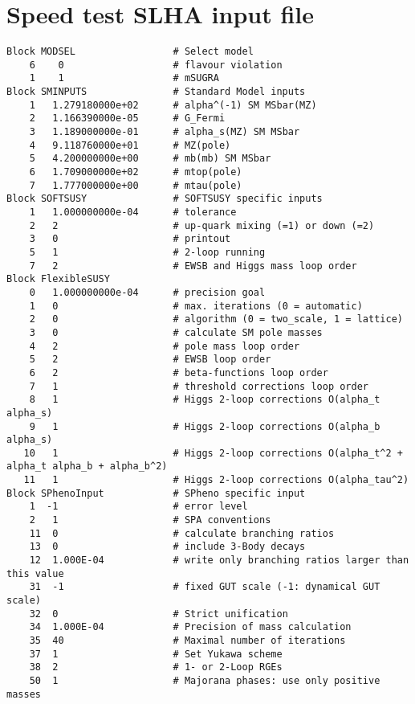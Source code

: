 \documentclass[final,3p,11pt,pdflatex]{elsarticle}
\begin{document}
\section{Speed test SLHA input file}
\label{sec:speed-test-slha-template-file}
%
\begin{lstlisting}
Block MODSEL                 # Select model
    6    0                   # flavour violation
    1    1                   # mSUGRA
Block SMINPUTS               # Standard Model inputs
    1   1.279180000e+02      # alpha^(-1) SM MSbar(MZ)
    2   1.166390000e-05      # G_Fermi
    3   1.189000000e-01      # alpha_s(MZ) SM MSbar
    4   9.118760000e+01      # MZ(pole)
    5   4.200000000e+00      # mb(mb) SM MSbar
    6   1.709000000e+02      # mtop(pole)
    7   1.777000000e+00      # mtau(pole)
Block SOFTSUSY               # SOFTSUSY specific inputs
    1   1.000000000e-04      # tolerance
    2   2                    # up-quark mixing (=1) or down (=2)
    3   0                    # printout
    5   1                    # 2-loop running
    7   2                    # EWSB and Higgs mass loop order
Block FlexibleSUSY
    0   1.000000000e-04      # precision goal
    1   0                    # max. iterations (0 = automatic)
    2   0                    # algorithm (0 = two_scale, 1 = lattice)
    3   0                    # calculate SM pole masses
    4   2                    # pole mass loop order
    5   2                    # EWSB loop order
    6   2                    # beta-functions loop order
    7   1                    # threshold corrections loop order
    8   1                    # Higgs 2-loop corrections O(alpha_t alpha_s)
    9   1                    # Higgs 2-loop corrections O(alpha_b alpha_s)
   10   1                    # Higgs 2-loop corrections O(alpha_t^2 + alpha_t alpha_b + alpha_b^2)
   11   1                    # Higgs 2-loop corrections O(alpha_tau^2)
Block SPhenoInput            # SPheno specific input
    1  -1                    # error level
    2   1                    # SPA conventions
    11  0                    # calculate branching ratios
    13  0                    # include 3-Body decays
    12  1.000E-04            # write only branching ratios larger than this value
    31  -1                   # fixed GUT scale (-1: dynamical GUT scale)
    32  0                    # Strict unification
    34  1.000E-04            # Precision of mass calculation
    35  40                   # Maximal number of iterations
    37  1                    # Set Yukawa scheme
    38  2                    # 1- or 2-Loop RGEs
    50  1                    # Majorana phases: use only positive masses

\end{lstlisting}
\end{document}
